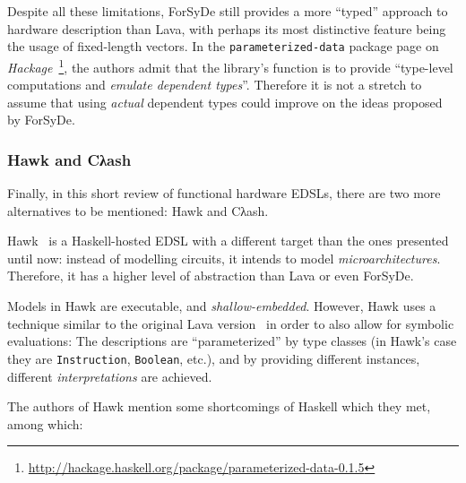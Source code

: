             Despite all these limitations,
            ForSyDe still provides a more ``typed'' approach to hardware description than Lava,
            with perhaps its most distinctive feature being the usage of fixed-length vectors.
            In the \texttt{parameterized-data} package page
            on \emph{Hackage}~\footnote{\url{http://hackage.haskell.org/package/parameterized-data-0.1.5}},
            the authors admit that the library's function is to provide
            ``type-level computations and \emph{emulate dependent types}''.
            Therefore it is not a stretch to assume that using \emph{actual} dependent types
            could improve on the ideas proposed by ForSyDe.


            \subsubsection{Hawk and Cλash}
            Finally, in this short review of functional hardware \acp{EDSL},
            there are two more alternatives to be mentioned: Hawk and Cλash.

            Hawk~\cite{hawk-haskell} is a Haskell-hosted \ac{EDSL} with a different target than
            the ones presented until now: instead of modelling circuits, it intends to model \emph{microarchitectures}.
            Therefore, it has a higher level of abstraction than Lava or even ForSyDe.

            Models in Hawk are executable, and \emph{shallow-embedded}.
            However, Hawk uses a technique similar to the original Lava version~\cite{lava-1999}
            in order to also allow for symbolic evaluations:
            The descriptions are ``parameterized'' by type classes
            (in Hawk's case they are \texttt{Instruction}, \texttt{Boolean}, etc.),
            and by providing different instances, different \emph{interpretations} are achieved.

            The authors of Hawk mention some shortcomings of Haskell which they met, among which:

